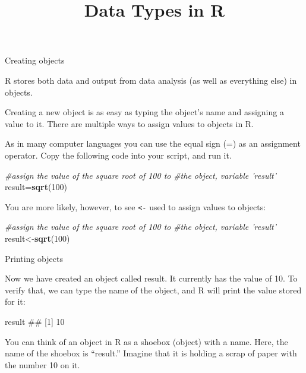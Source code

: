 \documentclass[ignorenonframetext,]{beamer}
\title{Data Types in R}
\date{}
\newenvironment{Shaded}{\begin{snugshade}}{\end{snugshade}}
\newcommand{\KeywordTok}[1]{\textcolor[rgb]{0.13,0.29,0.53}{\textbf{#1}}}
\newcommand{\DecValTok}[1]{\textcolor[rgb]{0.00,0.00,0.81}{#1}}
\newcommand{\CommentTok}[1]{\textcolor[rgb]{0.56,0.35,0.01}{\textit{#1}}}
\newcommand{\NormalTok}[1]{#1}
\begin{document}
\frame{\titlepage}

\begin{frame}[fragile]{Creating objects}

R stores both data and output from data analysis (as well as everything
else) in objects.

Creating a new object is as easy as typing the object's name and
assigning a value to it. There are multiple ways to assign values to
objects in R.

As in many computer languages you can use the equal sign (=) as an
assignment operator. Copy the following code into your script, and run
it.

\begin{Shaded}
\begin{Highlighting}[]
\CommentTok{#assign the value of the square root of 100 to }
\CommentTok{#the object, variable 'result'}
\NormalTok{result=}\KeywordTok{sqrt}\NormalTok{(}\DecValTok{100}\NormalTok{)}
\end{Highlighting}
\end{Shaded}

\end{frame}

\begin{frame}[fragile]

You are more likely, however, to see \texttt{\textless{}-} used to
assign values to objects:

\begin{Shaded}
\begin{Highlighting}[]
\CommentTok{#assign the value of the square root of 100 to}
\CommentTok{#the object, variable 'result'}
\NormalTok{result<-}\KeywordTok{sqrt}\NormalTok{(}\DecValTok{100}\NormalTok{)}
\end{Highlighting}
\end{Shaded}

\end{frame}

\begin{frame}[fragile]{Printing objects}

Now we have created an object called result. It currently has the value
of 10. To verify that, we can type the name of the object, and R will
print the value stored for it:

\begin{Shaded}
\begin{Highlighting}[]
\NormalTok{result}
\NormalTok{## [1] 10}
\end{Highlighting}
\end{Shaded}

You can think of an object in R as a shoebox (object) with a name. Here,
the name of the shoebox is ``result.'' Imagine that it is holding a
scrap of paper with the number 10 on it.

\end{frame}
\end{document}
